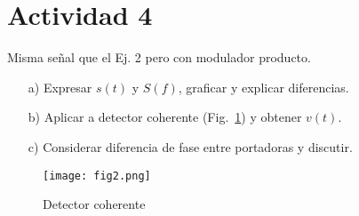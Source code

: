\section{Actividad 4}

Misma señal que el Ej. 2 pero con modulador producto.  

\begin{itemize}
    \item[a)] Expresar $s(t)$ y $S(f)$, graficar y explicar diferencias.  
    \item[b)] Aplicar a detector coherente (Fig.~\ref{fig:2}) y obtener $v(t)$.  
    \item[c)] Considerar diferencia de fase entre portadoras y discutir.  
\end{itemize}

\begin{figure}[h!]
    \centering
    \texttt{[image: fig2.png]}
    \caption{Detector coherente}
    \label{fig:2}
\end{figure}
